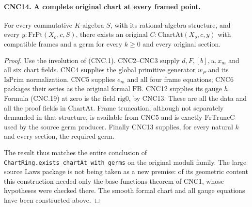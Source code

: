\paragraph{CNC14. A complete original chart at every framed point.}
\label{claim:CNC14}
For every commutative \(K\)-algebra \(S\), with its rational-algebra
structure, and every \(y:\mathrm{FrPt}(X_o,c,S)\), there exists
an original \(C:\mathrm{ChartAt}(X_o,c,y)\) with compatible frames
and a germ for every \(k\geq0\) and every original section.
\begin{proof}
Use the involution of (CNC.1).  CNC2--CNC3 supply
\(d,F,[b],u,x_m\) and all six chart fields.  CNC4 supplies the
global primitive generator \(w_P\) and its \(\mathrm{IsPrim}\)
normalization.  CNC5 supplies \(e_m\) and all four frame equations;
CNC6 packages their series as the original formal \(\mathrm{FB}\).
CNC12 supplies its gauge \(h\).  Formula (CNC.19) at zero is the
field \(\mathrm{rig0}\), by CNC13.  These are all the data and
all the proof fields in \(\mathrm{ChartAt}\).  Frame truncation,
although not separately demanded in that structure, is available from
CNC5 and is exactly \(\mathrm{FrTruncC}\) used by the source
germ producer.  Finally CNC13 supplies, for every natural \(k\) and
every section, the required germ.

The result thus matches the entire conclusion of
\texttt{ChartRing.exists\_chartAt\_with\_germs} on the original
moduli family.  The large source \(\mathrm{Laws}\) package is not
being taken as a new premise: of its geometric content this construction
needed only the base-functions theorem of CNC1, whose hypotheses were
checked there.  The smooth formal chart and all gauge equations have
been constructed above.
\end{proof}

